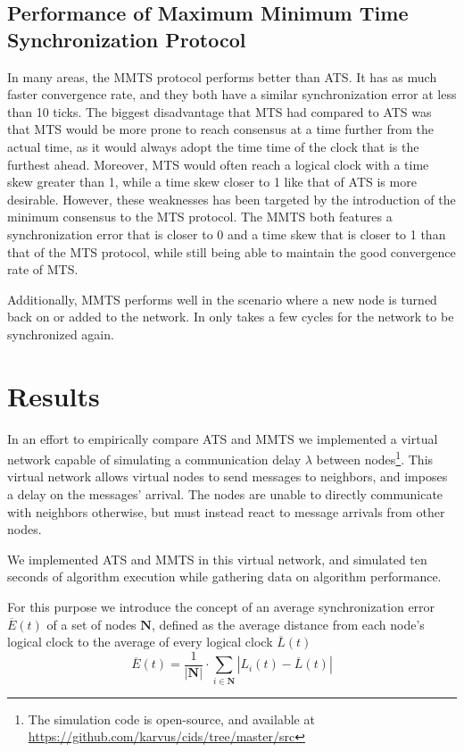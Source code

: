 \documentclass[a4paper,12pt]{article}
\begin{document}
\subsection{Performance of Maximum Minimum Time Synchronization Protocol}
In many areas, the MMTS protocol performs better than ATS. It has as much faster convergence rate, and they both have a similar synchronization error at less than 10 ticks. The biggest disadvantage that MTS had compared to ATS was that MTS would be more prone to reach consensus at a time further from the actual time, as it would always adopt the time time of the clock that is the furthest ahead. Moreover, MTS would often reach a logical clock with a time skew greater than 1, while a time skew closer to 1 like that of ATS is more desirable. However, these weaknesses has been targeted by the introduction of the minimum consensus to the MTS protocol. The MMTS both features a synchronization error that is closer to 0 and a time skew that is closer to 1 than that of the MTS protocol, while still being able to maintain the good convergence rate of MTS. \citep{HeChengShiChen13}

Additionally, MMTS performs well in the scenario where a new node is turned back on or added to the network. In only takes a few cycles for the network to be synchronized again. \citep{HeChengShiChen13}


\section{Results}

In an effort to empirically compare ATS and MMTS we implemented a virtual network capable of simulating a communication delay $\lambda$ between nodes\footnote{The simulation code is open-source, and available at \href{https://github.com/karvus/cids/tree/master/src}{https://github.com/karvus/cids/tree/master/src}}. This virtual network allows virtual nodes to send messages to neighbors, and imposes a delay on the messages' arrival. The nodes are unable to directly communicate with neighbors otherwise, but must instead react to message arrivals from other nodes.

We implemented ATS and MMTS in this virtual network, and simulated ten seconds of algorithm execution while gathering data on algorithm performance.

For this purpose we introduce the concept of an average synchronization error $\overline{E}(t)$ of a set of nodes $\boldsymbol{N}$, defined as the average distance from each node's logical clock to the average of every logical clock $\overline{L}(t)$ $$\overline{E}(t) = \frac{1}{|\boldsymbol{N}|} \cdot \sum_{i \in \boldsymbol{N}} \left| L_i(t) - \overline{L}(t) \right|$$
\end{document}
